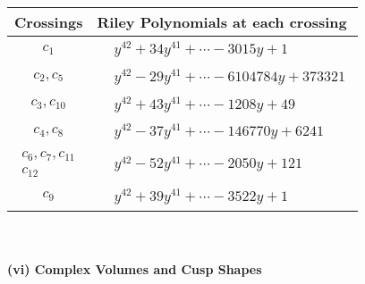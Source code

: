 \documentclass[1p]{elsarticle_modified}
\theoremstyle{definition}
\begin{document}
\begin{tabular}{m{50pt}|m{274pt}}
Crossings & \hspace{64pt}Riley Polynomials at each crossing \\
\hline $$\begin{aligned}c_{1}\end{aligned}$$&$\begin{aligned}
&y^{42}+34 y^{41}+\cdots-3015 y+1
\end{aligned}$\\
\hline $$\begin{aligned}c_{2},c_{5}\end{aligned}$$&$\begin{aligned}
&y^{42}-29 y^{41}+\cdots-6104784 y+373321
\end{aligned}$\\
\hline $$\begin{aligned}c_{3},c_{10}\end{aligned}$$&$\begin{aligned}
&y^{42}+43 y^{41}+\cdots-1208 y+49
\end{aligned}$\\
\hline $$\begin{aligned}c_{4},c_{8}\end{aligned}$$&$\begin{aligned}
&y^{42}-37 y^{41}+\cdots-146770 y+6241
\end{aligned}$\\
\hline $$\begin{aligned}c_{6},c_{7},c_{11}\\c_{12}\end{aligned}$$&$\begin{aligned}
&y^{42}-52 y^{41}+\cdots-2050 y+121
\end{aligned}$\\
\hline $$\begin{aligned}c_{9}\end{aligned}$$&$\begin{aligned}
&y^{42}+39 y^{41}+\cdots-3522 y+1
\end{aligned}$\\
\hline
\end{tabular}\\~\\
\newpage\flushleft \textbf{(vi) Complex Volumes and Cusp Shapes}
\end{document}
